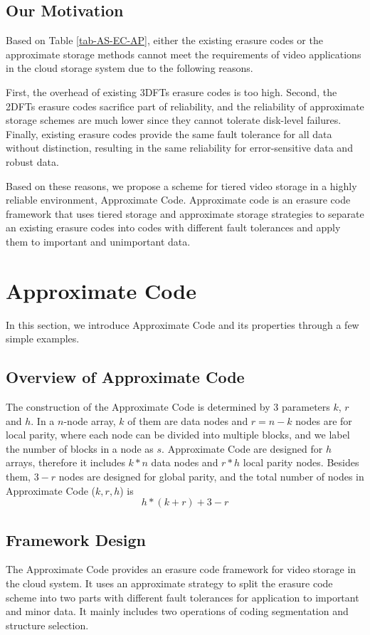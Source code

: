 \documentclass[sigconf]{acmart}
\begin{document}
\subsection{Our Motivation}
Based on Table \ref{tab-AS-EC-AP}, either the existing erasure codes or the approximate storage methods cannot meet the requirements of video applications in the cloud storage system due to the following reasons. 

First, the overhead of existing 3DFTs erasure codes is too high.
Second, the 2DFTs erasure codes sacrifice part of reliability, and the reliability of approximate storage schemes are much lower since they cannot tolerate disk-level failures.
Finally, existing erasure codes provide the same fault tolerance for all data without distinction, resulting in the same reliability for error-sensitive data and robust data.

Based on these reasons, we propose a scheme for tiered video storage in a highly reliable environment, Approximate Code.
Approximate code is an erasure code framework that uses tiered storage\cite{krish2014hats} \cite{wang2014balancing} \cite{zhang2010automated} \cite{udipi2012lot} and approximate storage strategies to separate an existing erasure codes into codes with different fault tolerances and apply them to important and unimportant data.

\section{Approximate Code}\label{ApCode}
In this section, we introduce Approximate Code and its properties through a few simple examples. 

\subsection{Overview of Approximate Code}
The construction of the Approximate Code is determined by 3 parameters $k$, $r$ and $h$. 
In a $n$-node array, $k$ of them are data nodes and $r=n-k$ nodes are for local parity, where each node can be divided into multiple blocks, and we label the number of blocks in a node as $s$.
Approximate Code are designed for $h$ arrays, therefore it includes $k*n$ data nodes and $r*h$ local parity nodes.
Besides them, $3-r$ nodes are designed for global parity, and the total number of nodes in Approximate Code ($k,r,h$) is $$h*(k+r) +3-r$$

\subsection{Framework Design}
The Approximate Code provides an erasure code framework for video storage in the cloud system. It uses an approximate strategy to split the erasure code scheme into two parts with different fault tolerances for application to important and minor data. It mainly includes two operations of coding segmentation and structure selection.
\end{document}
